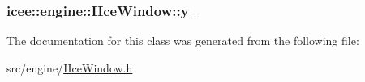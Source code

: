 \label{classicee_1_1engine_1_1IIceWindow_ad0a4dec01c6f8c8a964aa912a0051fac}
\hypertarget{classicee_1_1engine_1_1IIceWindow_a962150de24c538d079afc4f29148008b}{
\subsubsection[{y\_\-}]{ {\bf icee::engine::IIceWindow::y\_\-}}}
\label{classicee_1_1engine_1_1IIceWindow_a962150de24c538d079afc4f29148008b}


The documentation for this class was generated from the following file:\begin{DoxyCompactItemize}
\item 
src/engine/\hyperlink{IIceWindow_8h}{IIceWindow.h}\end{DoxyCompactItemize}
